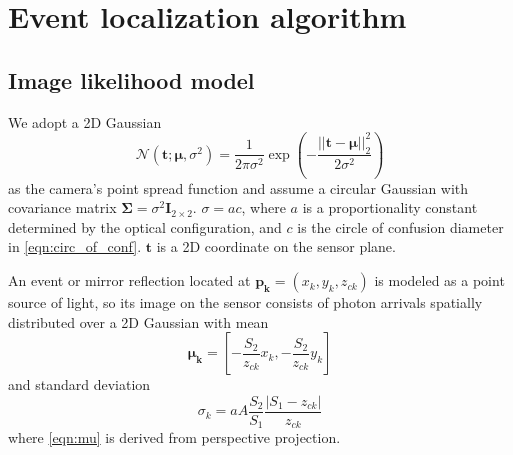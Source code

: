 \section{Event localization algorithm}

\subsection{Image likelihood model}

We adopt a 2D Gaussian 
\begin{equation}
\mathcal{N}(\bm{t};\bm{\mu},\sigma^2)=\frac{1}{2\pi\sigma^2}\exp\left({-\frac{||\bm{t}-\bm{\mu}||_2^2}{2\sigma^2}}\right) 
\end{equation}
as the camera's point spread function and assume a circular Gaussian with 
covariance matrix $\bm{\Sigma}=\sigma^2 \bm{I}_{2\times2}$. 
$\sigma=ac$, where $a$ is a proportionality constant determined by the 
optical configuration, and $c$ is the circle of confusion diameter in \cref{eqn:circ_of_conf}.
$\bm{t}$ is a 2D coordinate on the sensor plane.

An event or mirror reflection located at $\bm{p_k}=(x_k,y_k,z_{ck})$ is modeled as 
a point source of light, so its image on the sensor consists of photon arrivals 
spatially distributed over a 2D Gaussian with mean 
\begin{equation} \label{eqn:mu}
\bm{\mu_k}=\left[ -\frac{S_2}{z_{ck}}x_k, -\frac{S_2}{z_{ck}}y_k \right]
\end{equation}
and standard deviation 
\begin{equation} \label{eqn:stdev}
\sigma_k=aA\frac{S_2}{S_1}\frac{|S_1-z_{ck}|}{z_{ck}}
\end{equation}
where \cref{eqn:mu} is derived from perspective projection.

